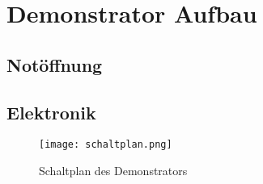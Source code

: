 \section{Demonstrator Aufbau}

\subsection{Notöffnung}

\subsection{Elektronik}


\begin{figure}
\centering
\texttt{[image: schaltplan.png]}
\caption{Schaltplan des Demonstrators}
\end{figure}

